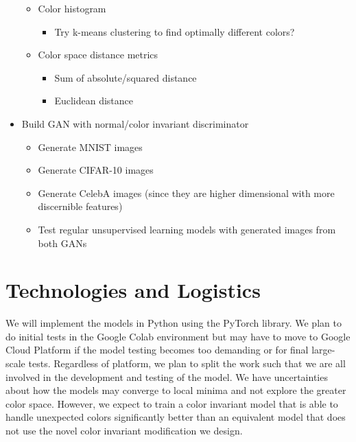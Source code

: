 \documentclass[10pt, a4paper]{article}
\begin{document}
\begin{itemize}
\begin{itemize}
              \item Color histogram
                    \begin{itemize}
                        \item Try k-means clustering to find optimally different colors?
                    \end{itemize}
              \item Color space distance metrics
                    \begin{itemize}
                        \item Sum of absolute/squared distance
                        \item Euclidean distance
                    \end{itemize}
          \end{itemize}
    \item Build GAN with normal/color invariant discriminator
          \begin{itemize}
              \item Generate MNIST images
              \item Generate CIFAR-10 images
              \item Generate CelebA images (since they are higher dimensional with more discernible features)
              \item Test regular unsupervised learning models with generated images from both GANs
          \end{itemize}
\end{itemize}

\section{Technologies and Logistics}
We will implement the models in Python using the PyTorch library. We plan to do initial tests in the Google Colab environment but may have to move to Google Cloud Platform if the model testing becomes too demanding or for final large-scale tests. Regardless of platform, we plan to split the work such that we are all involved in the development and testing of the model. We have uncertainties about how the models may converge to local minima and not explore the greater color space. However, we expect to train a color invariant model that is able to handle unexpected colors significantly better than an equivalent model that does not use the novel color invariant modification we design.



\end{document}
